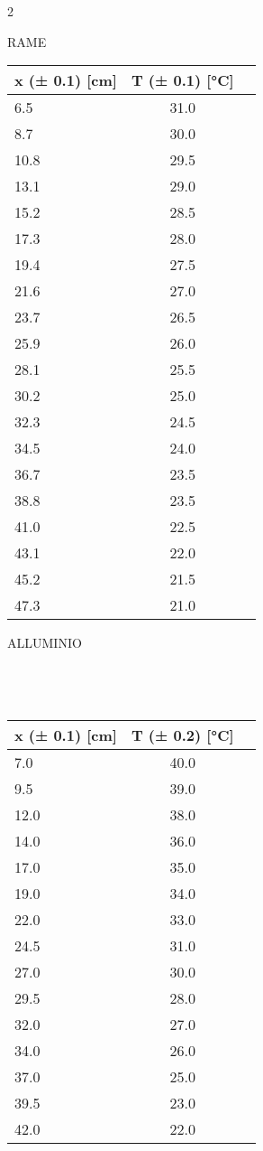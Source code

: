 \documentclass{article}
\begin{document}
\begin{multicols} {2}

\quad \quad \quad \quad \quad \quad RAME
\begin{center}
\begin{tabular}{lcl}
    \toprule
    x (± 0.1) [cm]  & T (± 0.1) [°C] \\
    \midrule
    6.5 & 31.0 \\
    8.7 & 30.0 \\
    10.8 & 29.5 \\
    13.1 & 29.0 \\
    15.2 & 28.5 \\
    17.3 & 28.0 \\
    19.4 & 27.5 \\
    21.6 & 27.0 \\
    23.7 & 26.5 \\
    25.9 & 26.0 \\
    28.1 & 25.5 \\
    30.2 & 25.0 \\
    32.3 & 24.5 \\
    34.5 & 24.0 \\
    36.7 & 23.5 \\
    38.8 & 23.5 \\
    41.0 & 22.5 \\
    43.1 & 22.0 \\
    45.2 & 21.5 \\
    47.3 & 21.0 \\
    \bottomrule
\end{tabular}
\end{center}

ALLUMINIO
    \\
    \\
    \\
    \\
\begin{tabular}{lcl}
    \toprule 
    x (± 0.1) [cm]  & T (± 0.2) [°C] \\
    \midrule
    7.0 & 40.0 \\
    9.5 & 39.0 \\
    12.0 & 38.0 \\
    14.0 & 36.0 \\
    17.0 & 35.0 \\
    19.0 & 34.0 \\
    22.0 & 33.0 \\
    24.5 & 31.0 \\
    27.0 & 30.0 \\
    29.5 & 28.0 \\
    32.0 & 27.0 \\
    34.0 & 26.0 \\
    37.0 & 25.0 \\
    39.5 & 23.0 \\
    42.0 & 22.0 \\
    \bottomrule
\end{tabular}
\end{multicols}
\end{document}

